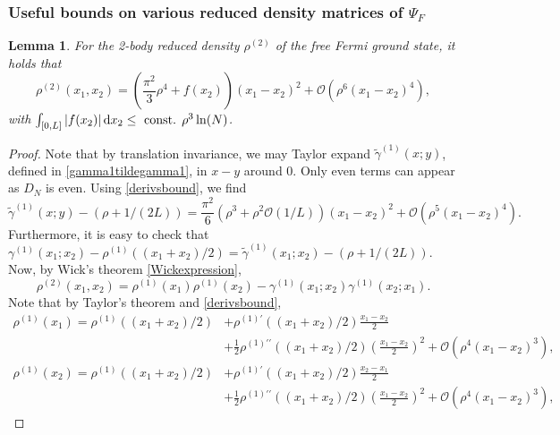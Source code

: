 \documentclass[a4paper,11pt]{article}
\newcommand{\abs}[1]{\left\lvert #1 \right\rvert}
\newcommand*\diff{\mathop{}\!\mathrm{d}}
\newtheorem{lemma}[theorem]{Lemma}
\numberwithin{equation}{section}
\begin{document}
 
 
	\subsubsection{Useful bounds on various reduced density matrices of $\Psi_F$}
	\begin{lemma}\label{Lemma rho2 bound}
	For the 2-body reduced density $\rho^{(2)}$ of the free Fermi ground state, it holds that
		\begin{equation}
		    \rho^{(2)}(x_1,x_2)=\left(\frac{\pi^2}{3}\rho^4+f(x_2)\right)(x_1-x_2)^2+\mathcal{O}(\rho^6(x_1-x_2)^4), 
		\end{equation} with $ \int_{[0,L]}\abs{f(x_2)}\diff x_2\leq \textnormal{ const. }\rho^3\ln(N) $.
	\end{lemma}
	\begin{proof}
		Note that by translation invariance, we may Taylor expand $\tilde{\gamma}^{(1)}(x;y)$, defined in \eqref{gamma1tildegamma1}, in $x-y$ around $0$. Only even terms can appear as $D_N$ is even. Using \eqref{derivsbound}, we find \begin{equation}\label{EqGammaTaylorExpansion}
		    \tilde{\gamma}^{(1)}(x;y)-(\rho+1/(2L))=\frac{\pi^2}{6}(\rho^3+\rho^2\mathcal{O}(1/L))(x_1-x_2)^2+\mathcal{O}(\rho^5(x_1-x_2)^4).
		\end{equation}
  Furthermore, it is easy to check that $ \gamma^{(1)}(x_1;x_2)-\rho^{(1)}\left((x_1+x_2)/2\right)=\tilde{\gamma}^{(1)}(x_1;x_2)-(\rho+1/(2L)) $. Now, by Wick's theorem \eqref{Wickexpression},  \begin{equation}
		\rho^{(2)}(x_1,x_2)=\rho^{(1)}(x_1)\rho^{(1)}(x_2)-\gamma^{(1)}(x_1;x_2)\gamma^{(1)}(x_2;x_1).
		\end{equation}
		Note that by Taylor's theorem and \eqref{derivsbound},
\begin{equation}
		\begin{aligned}
		\rho^{(1)}(x_1)=\rho^{(1)}((x_1+x_2)/2)&+\rho^{(1)\prime}((x_1+x_2)/2)\frac{x_1-x_2}{2}\\&+\frac{1}{2}\rho^{(1)\prime\prime}((x_1+x_2)/2)\left(\frac{x_1-x_2}{2}\right)^2+\mathcal{O}(\rho^4(x_1-x_2)^3),
		\end{aligned}
		\end{equation}
		\begin{equation}
		\begin{aligned}
		\rho^{(1)}(x_2)=\rho^{(1)}((x_1+x_2)/2)&+\rho^{(1)\prime}((x_1+x_2)/2)\frac{x_2-x_1}{2}\\&+\frac{1}{2}\rho^{(1)\prime\prime}((x_1+x_2)/2)\left(\frac{x_1-x_2}{2}\right)^2+\mathcal{O}(\rho^4(x_1-x_2)^3),

\end{aligned}
\end{equation}
\end{proof}
\end{document}
